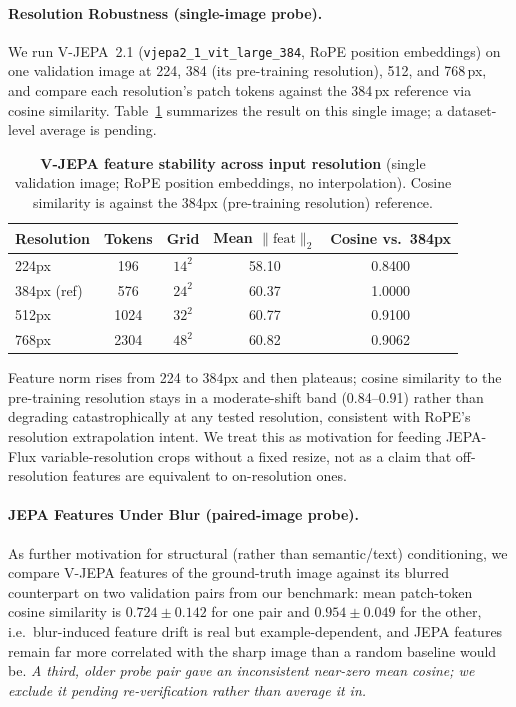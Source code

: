 \documentclass{article}
\begin{document}
\paragraph{Resolution Robustness (single-image probe).}
We run V-JEPA~2.1 (\texttt{vjepa2\_1\_vit\_large\_384}, RoPE position embeddings) on one validation image at 224, 384 (its pre-training resolution), 512, and 768\,px, and compare each resolution's patch tokens against the 384\,px reference via cosine similarity. Table~\ref{tab:jepa_resolution} summarizes the result on this single image; a dataset-level average is pending.

\begin{table}[h]
\centering
\caption{\textbf{V-JEPA feature stability across input resolution} (single validation image; RoPE position embeddings, no interpolation). Cosine similarity is against the 384px (pre-training resolution) reference.}
\label{tab:jepa_resolution}
\vspace{0.5em}
\begin{tabular}{@{}lcccc@{}}
\toprule
Resolution & Tokens & Grid & Mean $\|\text{feat}\|_2$ & Cosine vs.\ 384px \\
\midrule
224px & 196 & $14^2$ & 58.10 & 0.8400 \\
384px (ref) & 576 & $24^2$ & 60.37 & 1.0000 \\
512px & 1024 & $32^2$ & 60.77 & 0.9100 \\
768px & 2304 & $48^2$ & 60.82 & 0.9062 \\
\bottomrule
\end{tabular}
\end{table}

Feature norm rises from 224 to 384px and then plateaus; cosine similarity to the pre-training resolution stays in a moderate-shift band (0.84--0.91) rather than degrading catastrophically at any tested resolution, consistent with RoPE's resolution extrapolation intent. We treat this as motivation for feeding JEPA-Flux variable-resolution crops without a fixed resize, not as a claim that off-resolution features are equivalent to on-resolution ones.

\paragraph{JEPA Features Under Blur (paired-image probe).}
As further motivation for structural (rather than semantic/text) conditioning, we compare V-JEPA features of the ground-truth image against its blurred counterpart on two validation pairs from our benchmark: mean patch-token cosine similarity is $0.724 \pm 0.142$ for one pair and $0.954 \pm 0.049$ for the other, i.e.\ blur-induced feature drift is real but example-dependent, and JEPA features remain far more correlated with the sharp image than a random baseline would be. \textit{A third, older probe pair gave an inconsistent near-zero mean cosine; we exclude it pending re-verification rather than average it in.}
\end{document}

